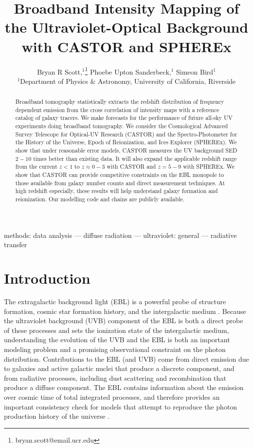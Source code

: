\documentclass[fleqn,usenatbib]{mnras}
\title[UVB Tomography with CASTOR and SPHEREx]{Broadband Intensity Mapping of the Ultraviolet-Optical Background with  CASTOR and SPHEREx}
\author[Scott, Upton Sanderbeck, and Bird]{Bryan R Scott,$^{1}$\thanks{bryan.scott@email.ucr.edu}
Phoebe Upton Sanderbeck,$^{1}$
Simeon Bird$^{1}$
\\
$^1$Department of Physics \& Astronomy, University of California, Riverside}
\begin{document}
\label{firstpage}
\pagerange{\pageref{firstpage}--\pageref{lastpage}}
\maketitle


\begin{abstract}
Broadband tomography statistically extracts the redshift distribution of frequency dependent emission from the cross correlation of intensity maps with a reference catalog of galaxy tracers. We make forecasts for the performance of future all-sky UV experiments doing broadband tomography. We consider the Cosmological Advanced Survey Telescope for Optical-UV Research (CASTOR) and the Spectro-Photometer for the History of the Universe, Epoch of Reionization, and Ices Explorer (SPHEREx). We show that under reasonable error models, CASTOR measures the UV background SED $2-10$ times better than existing data. It will also expand the applicable redshift range from the current $z < 1$ to $z \approx 0-3$ with CASTOR and $z =5-9$ with SPHEREx. We show that CASTOR can provide competitive constraints on the EBL monopole to those available from galaxy number counts and direct measurement techniques. At high redshift especially, these results will help understand galaxy formation and reionization. Our modelling code and chains are publicly available.
\end{abstract}


\begin{keywords}
methods: data analysis --- 
diffuse radiation --- ultraviolet: general --- radiative transfer 
\end{keywords}


\section{Introduction} \label{sec:intro}

The extragalactic background light (EBL) is a powerful probe of structure formation, cosmic star formation history, and the intergalactic medium \citep{Overduin_2004, McQuinn_2013}. Because the ultraviolet background (UVB) component of the EBL is both a direct probe of these processes and sets the ionization state of the intergalactic medium, understanding the evolution of the UVB and the EBL is both an important modeling problem and a promising observational constraint on the photon distribution. Contributions to the EBL (and UVB) come from direct emission due to galaxies and active galactic nuclei that produce a discrete component, and from radiative processes, including dust scattering and recombination that produce a diffuse component. The EBL contains information about the emission over cosmic time of total integrated processes, and therefore provides an important consistency check for models that attempt to reproduce the photon production history of the universe \citep{Hauser}.
\end{document}
